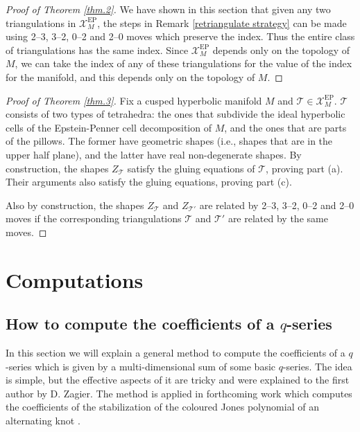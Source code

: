 \documentclass[12pt]{amsart}
\theoremstyle{definition}
\theoremstyle{remark}
\def\calX{\mathcal X}
\def\lbl{\label}
\newcommand{\CT}{\mathcal{T}}
\def\EP{\mathrm{EP}}
\begin{document}
\begin{proof}[Proof of Theorem \ref{thm.2}]
We have shown in this section that given any two triangulations in $\calX_M^{\EP}$, the steps in Remark \ref{retriangulate strategy} can be made using 2--3, 3--2, 0--2 and 2--0 moves which preserve the index. Thus the entire class of triangulations has the same index. Since $\calX_M^{\EP}$ depends only on the topology of $M$, we can take the index of any of these triangulations for the value of the index for the manifold, and this depends only on the topology of $M$.
\end{proof}

\begin{proof}[Proof of Theorem \ref{thm.3}]
Fix a cusped hyperbolic manifold $M$ and $\CT \in \calX_M^{\EP}$. $\CT$
consists of two types of tetrahedra: the ones that subdivide the ideal
hyperbolic cells of the Epstein-Penner cell decomposition of $M$, and the
ones that are parts of the pillows. The former have geometric shapes (i.e.,
shapes that are in the upper half plane), and the latter have real 
non-degenerate shapes. By construction, the shapes $Z_{\CT}$ 
satisfy the gluing equations of $\CT$, proving part (a). Their arguments
also satisfy the gluing equations, proving part (c).

Also by construction, the shapes $Z_{\CT}$ and $Z_{\CT'}$ are related by
2--3, 3--2, 0--2 and 2--0 moves if the corresponding triangulations 
$\CT$ and $\CT'$ are related by the same moves. 
\end{proof}


\section{Computations}
\lbl{sec.computation}

\subsection{How to compute the coefficients of a $q$-series}
\lbl{sub.overview.compute}

In this section we will explain a general method to compute the
coefficients of a $q$-series which is given by a multi-dimensional sum
of some basic $q$-series. The idea is simple, but the effective aspects
of it are tricky and were explained to the first author by D. Zagier. 
The method is applied in forthcoming work \cite{GV} which computes the 
coefficients of the stabilization of the coloured Jones polynomial of 
an alternating knot \cite{GL2}.
\end{document}
